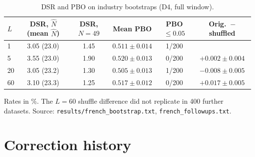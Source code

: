 \documentclass[11pt,a4paper]{article}
\theoremstyle{remark}
\begin{document}
\begin{table}[h]
\centering\small
\caption{DSR and PBO on industry bootstraps (D4, full window).}\label{tab:d4extra}
\begin{tabular}{@{}lccccc@{}}
\toprule
$L$ & DSR, $\hat N$ (mean $\hat N$) & DSR, $N=49$ & Mean PBO & PBO$\le0.05$ & Orig.\ $-$ shuffled \\
\midrule
1 & 3.05 (23.0) & 1.45 & $0.511\pm0.014$ & 1/200 & \\
5 & 3.55 (23.0) & 1.90 & $0.520\pm0.013$ & 0/200 & $+0.002\pm0.004$ \\
20 & 3.05 (23.2) & 1.30 & $0.505\pm0.013$ & 1/200 & $-0.008\pm0.005$ \\
60 & 3.10 (23.3) & 1.25 & $0.517\pm0.012$ & 0/200 & $+0.017\pm0.005$ \\
\bottomrule
\end{tabular}
\par\smallskip\raggedright\footnotesize Rates in \%. The $L=60$ shuffle difference did not replicate in 400 further datasets. Source: \texttt{results/french\_bootstrap.txt}, \texttt{french\_followups.txt}.
\end{table}

\section{Correction history}\label{app:corrections}
\end{document}
